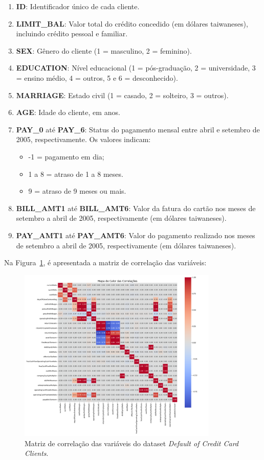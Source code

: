\begin{enumerate}
    \item \textbf{ID}: Identificador único de cada cliente.
    \item \textbf{LIMIT\_BAL}: Valor total do crédito concedido (em dólares taiwaneses), incluindo crédito pessoal e familiar.
    \item \textbf{SEX}: Gênero do cliente (1 = masculino, 2 = feminino).
    \item \textbf{EDUCATION}: Nível educacional (1 = pós-graduação, 2 = universidade, 3 = ensino médio, 4 = outros, 5 e 6 = desconhecido).
    \item \textbf{MARRIAGE}: Estado civil (1 = casado, 2 = solteiro, 3 = outros).
    \item \textbf{AGE}: Idade do cliente, em anos.
    \item \textbf{PAY\_0} até \textbf{PAY\_6}: Status do pagamento mensal entre abril e setembro de 2005, respectivamente. Os valores indicam:
    \begin{itemize}
        \item -1 = pagamento em dia;
        \item 1 a 8 = atraso de 1 a 8 meses.
        \item 9 = atraso de 9 meses ou mais.
    \end{itemize}
    \item \textbf{BILL\_AMT1} até \textbf{BILL\_AMT6}: Valor da fatura do cartão nos meses de setembro a abril de 2005, respectivamente (em dólares taiwaneses).
    \item \textbf{PAY\_AMT1} até \textbf{PAY\_AMT6}: Valor do pagamento realizado nos meses de setembro a abril de 2005, respectivamente (em dólares taiwaneses).
\end{enumerate}
Na Figura~\ref{fig:matriz_correlacao_inadimplencia}, é apresentada a matriz de correlação das variáveis:

\begin{figure}[H]
    \centering
    \includegraphics[width=0.85\textwidth]{figs/matriz_correlacao_inadimplencia.png}
    \caption{Matriz de correlação das variáveis do dataset \textit{Default of Credit Card Clients}.}
    \label{fig:matriz_correlacao_inadimplencia}
\end{figure}

